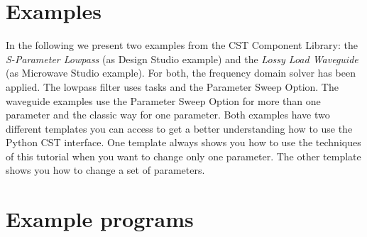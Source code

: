 \documentclass[12pt,accentcolor=tud2b, colorback, openany]{tudreport}
\begin{document}
	\chapter{Examples}
	In the following we present two examples from the CST Component Library: the \textit{S-Parameter Lowpass} (as Design Studio example) and the \textit{Lossy Load Waveguide} (as Microwave Studio example). For both, the frequency domain solver has been applied. The lowpass filter uses tasks and the Parameter Sweep Option. The waveguide examples use the Parameter Sweep Option for more than one parameter and the classic way for one parameter. Both examples have two different templates you can access to get a better understanding how to use the Python CST interface. One template always shows you how to use the techniques of this tutorial when you want to change only one parameter. The other template shows you how to change a set of parameters.
	
	
	\appendix
	\chapter{Example programs}
	
	\newpage
	
	
	
	
	
	
	
	
	
\end{document}

